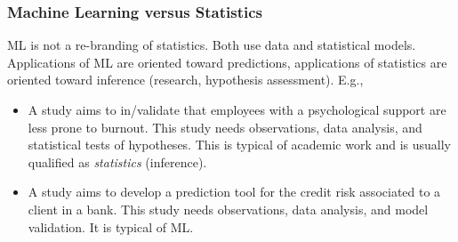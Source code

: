 \begin{frame}
\frametitle{Machine Learning versus Statistics}
ML is not a re-branding of statistics. Both use data and statistical models. Applications of ML are oriented toward predictions, applications of statistics are oriented toward inference (research, hypothesis assessment). E.g.,
\begin{itemize}
\item A study aims to in/validate that employees with a psychological support are less prone to burnout. This study needs observations, data analysis, and statistical tests of hypotheses. This is typical of academic work and is usually qualified as {\it statistics} (inference).
\item A study aims to develop a prediction tool for the credit risk associated to a client in a bank. This study needs observations, data analysis, and model validation. It is typical of ML.
\end{itemize}
\end{frame}
